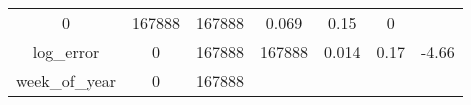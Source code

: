 \documentclass[]{book}
\theoremstyle{definition}
\theoremstyle{definition}
\theoremstyle{definition}
\theoremstyle{remark}
\begin{document}
\begin{longtable}[]{@{}ccccccc@{}}
\begin{minipage}[t]{0.11\columnwidth}
0\strut
\end{minipage} & \begin{minipage}[t]{0.12\columnwidth}\centering\strut
167888\strut
\end{minipage} & \begin{minipage}[t]{0.10\columnwidth}\centering\strut
167888\strut
\end{minipage} & \begin{minipage}[t]{0.11\columnwidth}\centering\strut
0.069\strut
\end{minipage} & \begin{minipage}[t]{0.09\columnwidth}\centering\strut
0.15\strut
\end{minipage} & \begin{minipage}[t]{0.09\columnwidth}\centering\strut
0\strut
\end{minipage}\tabularnewline
\begin{minipage}[t]{0.20\columnwidth}\centering\strut
log\_error\strut
\end{minipage} & \begin{minipage}[t]{0.11\columnwidth}\centering\strut
0\strut
\end{minipage} & \begin{minipage}[t]{0.12\columnwidth}\centering\strut
167888\strut
\end{minipage} & \begin{minipage}[t]{0.10\columnwidth}\centering\strut
167888\strut
\end{minipage} & \begin{minipage}[t]{0.11\columnwidth}\centering\strut
0.014\strut
\end{minipage} & \begin{minipage}[t]{0.09\columnwidth}\centering\strut
0.17\strut
\end{minipage} & \begin{minipage}[t]{0.09\columnwidth}\centering\strut
-4.66\strut
\end{minipage}\tabularnewline
\begin{minipage}[t]{0.20\columnwidth}\centering\strut
week\_of\_year\strut
\end{minipage} & \begin{minipage}[t]{0.11\columnwidth}\centering\strut
0\strut
\end{minipage} & \begin{minipage}[t]{0.12\columnwidth}\centering\strut
167888\strut
\end{minipage} & \begin{minipage}[t]{0.10\columnwidth}\centering\strut

\end{minipage}
\end{longtable}
\end{document}
